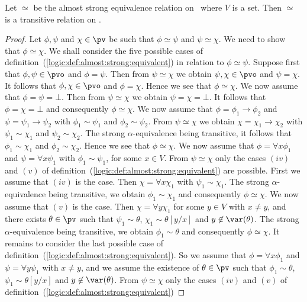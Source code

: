 \begin{prop}\label{logic:prop:almost:strong:transitive}
Let $\simeq$ be the almost strong equivalence relation on \pv\ where
$V$ is a set. Then $\simeq$ is a transitive relation on \pv.
\end{prop}

\noindent
\begin{proof}
Let $\phi,\psi$ and $\chi\in\pv$ be such that $\phi\simeq\psi$ and
$\psi\simeq\chi$. We need to show that $\phi\simeq\chi$. We shall
consider the five possible cases of
definition~(\ref{logic:def:almost:strong:equivalent}) in relation to
$\phi\simeq\psi$. Suppose first that $\phi,\psi\in\pvo$ and
$\phi=\psi$. Then from $\psi\simeq\chi$ we obtain $\psi,\chi\in\pvo$
and $\psi=\chi$. It follows that $\phi,\chi\in\pvo$ and $\phi=\chi$.
Hence we see that $\phi\simeq\chi$. We now assume that
$\phi=\psi=\bot$. Then from $\psi\simeq\chi$ we obtain
$\psi=\chi=\bot$. It follows that $\phi=\chi=\bot$ and consequently
$\phi\simeq\chi$. We now assume that $\phi=\phi_{1}\to\phi_{2}$ and
$\psi=\psi_{1}\to\psi_{2}$ with $\phi_{1}\sim\psi_{1}$ and
$\phi_{2}\sim\psi_{2}$. From $\psi\simeq\chi$ we obtain
$\chi=\chi_{1}\to\chi_{2}$ with $\psi_{1}\sim\chi_{1}$ and
$\psi_{2}\sim\chi_{2}$. The strong $\alpha$-equivalence being
transitive, it follows that $\phi_{1}\sim\chi_{1}$ and
$\phi_{2}\sim\chi_{2}$. Hence we see that $\phi\simeq\chi$. We now
assume that $\phi=\forall x\phi_{1}$ and $\psi=\forall x\psi_{1}$
with $\phi_{1}\sim\psi_{1}$, for some $x\in V$. From
$\psi\simeq\chi$ only the cases $(iv)$ and $(v)$ of
definition~(\ref{logic:def:almost:strong:equivalent}) are possible.
First we assume that $(iv)$ is the case. Then $\chi=\forall
x\chi_{1}$ with $\psi_{1}\sim\chi_{1}$. The strong $\alpha$-equivalence 
being transitive, we obtain $\phi_{1}\sim\chi_{1}$ and
consequently $\phi\simeq\chi$. We now assume that $(v)$ is the case.
Then $\chi=\forall y\chi_{1}$ for some $y\in V$ with $x\neq y$, and
there exists $\theta\in\pv$ such that $\psi_{1}\sim\theta$,
$\chi_{1}\sim\theta[y/x]$ and $y\not\in\var(\theta)$. The strong 
$\alpha$-equivalence being transitive, we obtain
$\phi_{1}\sim\theta$ and consequently $\phi\simeq\chi$. It remains
to consider the last possible case of
definition~(\ref{logic:def:almost:strong:equivalent}). So we assume
that $\phi=\forall x\phi_{1}$ and $\psi=\forall y\psi_{1}$ with
$x\neq y$, and we assume the existence of $\theta\in\pv$ such that
$\phi_{1}\sim\theta$, $\psi_{1}\sim\theta[y/x]$ and
$y\not\in\var(\theta)$. From $\psi\simeq\chi$ only the cases $(iv)$
and $(v)$ of definition~(\ref{logic:def:almost:strong:equivalent})

\end{proof}
